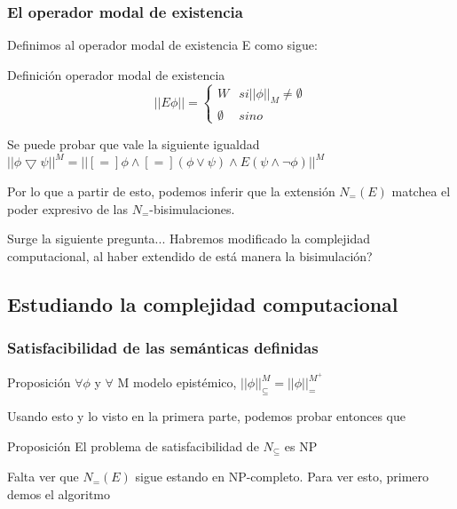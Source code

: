 \documentclass{beamer}
\begin{document}
\begin{frame}
\frametitle{El operador modal de existencia}

Definimos al operador modal de existencia E como sigue:

\begin{block}{Definici\'on operador modal de existencia}
\[ ||E\phi|| = \begin{cases} 
      W & si ||\phi||_{M} \neq \emptyset \\
      \emptyset & sino
   \end{cases}
\]
\end{block}

Se puede probar que vale la siguiente igualdad
$||\phi \bigtriangledown \psi||^{M} = ||[=]\phi \land [=](\phi \lor \psi) \land E(\psi \land \neg \phi)||^{M}$

Por lo que a partir de esto, podemos inferir que la extensi\'on $N_{=}(E)$ matchea el poder expresivo de las $N_{=}$-bisimulaciones.

Surge la siguiente pregunta... Habremos modificado la complejidad computacional, al haber extendido de est\'a manera la bisimulaci\'on?
\end{frame}

\subsection{Estudiando la complejidad computacional}

\begin{frame}
\frametitle {Satisfacibilidad de las sem\'anticas definidas}

\begin{block}{Proposici\'on}
$\forall \phi$ y $\forall$ M modelo epist\'emico, $||\phi||_{\subseteq}^{M} = ||\phi||_{=}^{M^{+}}$ 
\end{block}

Usando esto y lo visto en la primera parte, podemos probar entonces que
\begin{block}{Proposici\'on}
El problema de satisfacibilidad de $N_{\subseteq}$ es NP
\end{block}

Falta ver que $N_{=}(E)$ sigue estando en NP-completo. Para ver esto, primero demos el algoritmo

\end{frame}
\end{document}
